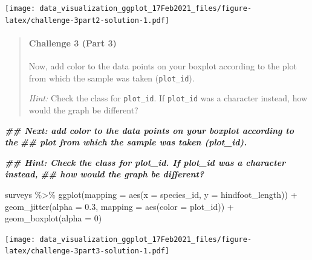 \documentclass[
]{article}
\newenvironment{Shaded}{\begin{snugshade}}{\end{snugshade}}
\newcommand{\AttributeTok}[1]{\textcolor[rgb]{0.77,0.63,0.00}{#1}}
\newcommand{\DecValTok}[1]{\textcolor[rgb]{0.00,0.00,0.81}{#1}}
\newcommand{\DocumentationTok}[1]{\textcolor[rgb]{0.56,0.35,0.01}{\textbf{\textit{#1}}}}
\newcommand{\FloatTok}[1]{\textcolor[rgb]{0.00,0.00,0.81}{#1}}
\newcommand{\FunctionTok}[1]{\textcolor[rgb]{0.00,0.00,0.00}{#1}}
\newcommand{\NormalTok}[1]{#1}
\newcommand{\SpecialCharTok}[1]{\textcolor[rgb]{0.00,0.00,0.00}{#1}}
\begin{document}
\texttt{[image: data\_visualization\_ggplot\_17Feb2021\_files/figure-latex/challenge-3part2-solution-1.pdf]}

\begin{quote}
\mbox{}%
\hypertarget{challenge-3-part-3}{%
\paragraph{Challenge 3 (Part 3)}\label{challenge-3-part-3}}

Now, add color to the data points on your boxplot according to the plot
from which the sample was taken (\texttt{plot\_id}).

\emph{Hint:} Check the class for \texttt{plot\_id}. If \texttt{plot\_id}
was a character instead, how would the graph be different?
\end{quote}

\begin{Shaded}
\begin{Highlighting}[]
\DocumentationTok{\#\# Next: add color to the data points on your boxplot according to the}
\DocumentationTok{\#\# plot from which the sample was taken (plot\_id).}

\DocumentationTok{\#\# Hint: Check the class for plot\_id\textasciigrave{}. If plot\_id was a character instead, }
\DocumentationTok{\#\# how would the graph be different? }
\end{Highlighting}
\end{Shaded}

\begin{Shaded}
\begin{Highlighting}[]
\NormalTok{surveys }\SpecialCharTok{\%\textgreater{}\%} 
  \FunctionTok{ggplot}\NormalTok{(}\AttributeTok{mapping =} \FunctionTok{aes}\NormalTok{(}\AttributeTok{x =}\NormalTok{ species\_id, }\AttributeTok{y =}\NormalTok{ hindfoot\_length)) }\SpecialCharTok{+}
  \FunctionTok{geom\_jitter}\NormalTok{(}\AttributeTok{alpha =} \FloatTok{0.3}\NormalTok{, }\AttributeTok{mapping =} \FunctionTok{aes}\NormalTok{(}\AttributeTok{color =}\NormalTok{ plot\_id)) }\SpecialCharTok{+}
  \FunctionTok{geom\_boxplot}\NormalTok{(}\AttributeTok{alpha =} \DecValTok{0}\NormalTok{) }
\end{Highlighting}
\end{Shaded}

\texttt{[image: data\_visualization\_ggplot\_17Feb2021\_files/figure-latex/challenge-3part3-solution-1.pdf]}

\begin{Shaded}
\end{Shaded}
\end{document}
